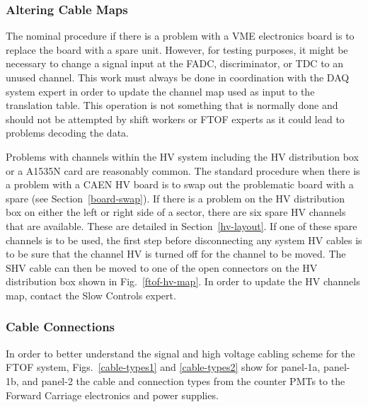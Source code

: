 \documentclass[12pt]{article}
\begin{document}
\subsubsection{Altering Cable Maps}

The nominal procedure if there is a problem with a VME electronics board is to replace 
the board with a spare unit. However, for testing purposes, it might be necessary to 
change a signal input at the FADC, discriminator, or TDC to an unused channel. This 
work must always be done in coordination with the DAQ system expert in order to update 
the channel map used as input to the translation table. This operation is not something 
that is normally done and should not be attempted by shift workers or FTOF experts as 
it could lead to problems decoding the data.

Problems with channels within the HV system including the HV distribution box or a A1535N
card are reasonably common. The standard procedure when there is a problem with a CAEN
HV board is to swap out the problematic board with a spare (see Section~\ref{board-swap}).
If there is a problem on the HV distribution box on either the left or right side of a sector,
there are six spare HV channels that are available. These are detailed in Section~\ref{hv-layout}.
If one of these spare channels is to be used, the first step before disconnecting any system HV
cables is to be sure that the channel HV is turned off for the channel to be moved. The SHV cable 
can then be moved to one of the open connectors on the HV distribution box shown in
Fig.~\ref{ftof-hv-map}. In order to update the HV channels map, contact the Slow Controls expert.

\subsubsection{Cable Connections}
\label{cable-connections}

In order to better understand the signal and high voltage cabling scheme for the FTOF 
system, Figs.~\ref{cable-types1} and \ref{cable-types2} show for panel-1a, panel-1b, 
and panel-2 the cable and connection types from the counter PMTs to the Forward Carriage 
electronics and power supplies.
\end{document}

